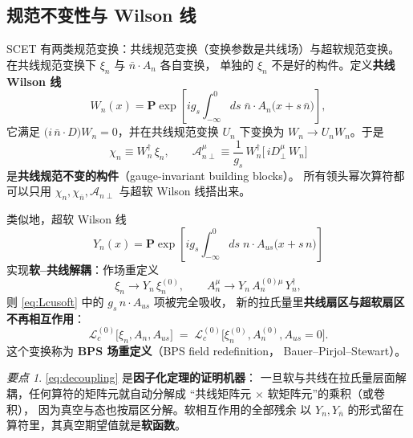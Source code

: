 \documentclass[UTF8,a4paper,11pt]{ctexart}
\theoremstyle{definition}
\theoremstyle{remark}
\newtheorem{keypoint}{要点}[section]
\theoremstyle{plain}
\newcommand{\en}[1]{\textsf{#1}}   %
\newcommand{\Pexp}{\mathbf{P}\exp}
\begin{document}
\subsection{规范不变性与 Wilson 线}
\label{subsec:wilson}

SCET 有两类规范变换：共线规范变换（变换参数是共线场）与超软规范变换。
在共线规范变换下 $\xi_n$ 与 $\bar n\cdot A_n$ 各自变换，
单独的 $\xi_n$ 不是好的构件。定义\textbf{共线 Wilson 线}
\begin{equation}
  W_n(x)=\Pexp\left[i g_s\!\int_{-\infty}^{0}\!ds\;
  \bar n\cdot A_n\big(x+s\,\bar n\big)\right],
  \label{eq:Wn}
\end{equation}
它满足 $\big(i\,\bar n\cdot D\big)W_n=0$，并在共线规范变换
$U_n$ 下变换为 $W_n\to U_nW_n$。于是
\begin{equation}
  \boxed{\;\chi_n\equiv W_n^\dagger\,\xi_n,
  \qquad
  \mathcal A_{n\perp}^\mu\equiv\frac{1}{g_s}\,
  W_n^\dagger\big[\,i D_{\perp}^\mu\,W_n\big]\;}
  \label{eq:building}
\end{equation}
是\textbf{共线规范不变的构件}（\en{gauge-invariant building blocks}）。
所有领头幂次算符都可以只用 $\chi_n,\chi_{\bar n},\mathcal A_{n\perp}$
与超软 Wilson 线搭出来。

类似地，超软 Wilson 线
\begin{equation}
  Y_n(x)=\Pexp\left[i g_s\!\int_{-\infty}^{0}\!ds\;
  n\cdot A_{us}\big(x+s\,n\big)\right]
  \label{eq:Yn}
\end{equation}
实现\textbf{软--共线解耦}：作场重定义
\begin{equation}
  \xi_n\to Y_n\,\xi_n^{(0)},
  \qquad
  A_n^\mu\to Y_n\,A_n^{(0)\mu}\,Y_n^\dagger ,
  \label{eq:BPS}
\end{equation}
则 \eqref{eq:Lcusoft} 中的 $g_s\,n\cdot A_{us}$ 项被完全吸收，
新的拉氏量里\textbf{共线扇区与超软扇区不再相互作用}：
\begin{equation}
  \mathcal L_c^{(0)}\big[\xi_n,A_n,A_{us}\big]
  \;=\;\mathcal L_c^{(0)}\big[\xi_n^{(0)},A_n^{(0)},A_{us}=0\big].
  \label{eq:decoupling}
\end{equation}
这个变换称为 \textbf{BPS 场重定义}（\en{BPS field redefinition}，
Bauer--Pirjol--Stewart）。

\begin{keypoint}
\eqref{eq:decoupling} 是\textbf{因子化定理的证明机器}：
一旦软与共线在拉氏量层面解耦，任何算符的矩阵元就自动分解成
“共线矩阵元 $\times$ 软矩阵元”的乘积（或卷积），
因为真空与态也按扇区分解。软相互作用的全部残余
以 $Y_n,Y_{\bar n}$ 的形式留在算符里，其真空期望值就是\textbf{软函数}。
\end{keypoint}
\end{document}
